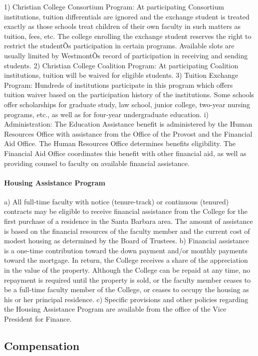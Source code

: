 \documentclass[letterpaper, 11pt]{article}
\begin{document}
				1) Christian College Consortium Program:  At participating Consortium institutions, tuition differentials are ignored and the exchange student is treated exactly as those schools treat children of their own faculty in such matters as tuition, fees, etc.  The college enrolling the exchange student reserves the right to restrict the studentÕs participation in certain programs.  Available slots are usually limited by WestmontÕs record of participation in receiving and sending students.
				2) Christian College Coalition Program:  At participating Coalition institutions, tuition will be waived for eligible students.
				3) Tuition Exchange Program:  Hundreds of institutions participate in this program which offers tuition waiver based on the participation history of the institutions. Some schools offer scholarships for graduate study, law school, junior college, two-year nursing programs, etc., as well as for four-year undergraduate education.
				i) Administration:
				The Education Assistance benefit is administered by the Human Resources Office with assistance from the Office of the Provost and the Financial Aid Office.  The Human Resources Office determines benefits eligibility.  The Financial Aid Office coordinates this benefit with other financial aid, as well as providing counsel to faculty on available financial assistance.
			\paragraph{Housing Assistance Program}
				a) All full-time faculty with notice (tenure-track) or continuous (tenured) contracts may be eligible to receive financial assistance from the College for the first purchase of a residence in the Santa Barbara area.  The amount of assistance is based on the financial resources of the faculty member and the current cost of modest housing as determined by the Board of Trustees.
				b) Financial assistance is a one-time contribution toward the down payment and/or monthly payments toward the mortgage.  In return, the College receives a share of the appreciation in the value of the property.  Although the College can be repaid at any time, no repayment is required until the property is sold, or the faculty member ceases to be a full-time faculty member of the College, or ceases to occupy the housing as his or her principal residence.
				c) Specific provisions and other policies regarding the Housing Assistance Program are available from the office of the Vice President for Finance.
	\subsection{Compensation}
\end{document}
